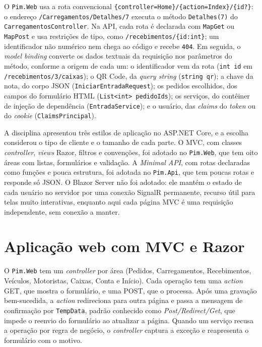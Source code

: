 O \texttt{Pim.Web} usa a rota convencional \texttt{\{controller=Home\}/\allowbreak\{action=Index\}/\allowbreak\{id?\}}: o endereço \texttt{/Carregamentos/\allowbreak Detalhes/7} executa o método \texttt{Detalhes(7)} do \texttt{Carregamentos\allowbreak Controller}. Na API, cada rota é declarada com \texttt{MapGet} ou \texttt{MapPost} e usa restrições de tipo, como \texttt{/recebimentos/\{id:int\}}; um identificador não numérico nem chega ao código e recebe \texttt{404}. Em seguida, o \textit{model binding} converte os dados textuais da requisição nos parâmetros do método, conforme a origem de cada um: o identificador vem da rota (\texttt{int id} em \texttt{/recebimentos/3/caixas}); o QR Code, da \textit{query string} (\texttt{string qr}); a chave da nota, do corpo JSON (\texttt{IniciarEntradaRequest}); os pedidos escolhidos, dos campos do formulário HTML (\texttt{List<int> pedidoIds}); os serviços, do contêiner de injeção de dependência (\texttt{EntradaService}); e o usuário, das \textit{claims} do \textit{token} ou do \textit{cookie} (\texttt{ClaimsPrincipal}).

A disciplina apresentou três estilos de aplicação no ASP.NET Core, e a escolha considerou o tipo de cliente e o tamanho de cada parte. O MVC, com classes \textit{controller}, \textit{views} Razor, filtros e convenções, foi adotado no \texttt{Pim.Web}, que tem oito áreas com listas, formulários e validação. A \textit{Minimal API}, com rotas declaradas como funções e pouca estrutura, foi adotada no \texttt{Pim.Api}, que tem poucas rotas e responde só JSON. O Blazor Server não foi adotado: ele mantém o estado de cada usuário no servidor por uma conexão SignalR permanente, recurso útil para telas muito interativas, enquanto aqui cada página MVC é uma requisição independente, sem conexão a manter.

\section{Aplicação web com MVC e Razor}

O \texttt{Pim.Web} tem um \textit{controller} por área (Pedidos, Carregamentos, Recebimentos, Veículos, Motoristas, Caixas, Conta e Início). Cada operação tem uma \textit{action} GET, que mostra o formulário, e uma POST, que o processa. Após uma gravação bem-sucedida, a \textit{action} redireciona para outra página e passa a mensagem de confirmação por \texttt{TempData}, padrão conhecido como \textit{Post/Redirect/Get}, que impede o reenvio do formulário ao atualizar a página. Quando um serviço recusa a operação por regra de negócio, o \textit{controller} captura a exceção e reapresenta o formulário com o motivo.

